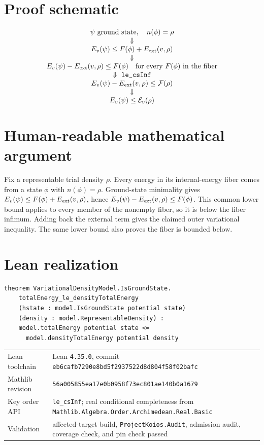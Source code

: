 \section{Proof schematic}
\[
\begin{array}{c}
 \psi\text{ ground state},\quad n(\phi)=\rho\\
 \Downarrow\\
 E_v(\psi)\le F(\phi)+E_{\rm ext}(v,\rho)\\
 \Downarrow\\
 E_v(\psi)-E_{\rm ext}(v,\rho)\le F(\phi)
 \quad\text{for every }F(\phi)\text{ in the fiber}\\
 \Downarrow\ \texttt{le\_csInf}\\
 E_v(\psi)-E_{\rm ext}(v,\rho)\le\mathcal F(\rho)\\
 \Downarrow\\
 E_v(\psi)\le\mathcal E_v(\rho)
\end{array}
\]

\section{Human-readable mathematical argument}
Fix a representable trial density \(\rho\).  Every energy in its internal-energy fiber comes from a
state \(\phi\) with \(n(\phi)=\rho\).  Ground-state minimality gives
\(E_v(\psi)\le F(\phi)+E_{\rm ext}(v,\rho)\), hence
\(E_v(\psi)-E_{\rm ext}(v,\rho)\le F(\phi)\).  This common lower bound applies to every member of
the nonempty fiber, so it is below the fiber infimum.  Adding back the external term gives the
claimed outer variational inequality.  The same lower bound also proves the fiber is bounded below.

\section{Lean realization}
\begin{lstlisting}
theorem VariationalDensityModel.IsGroundState.
    totalEnergy_le_densityTotalEnergy
    (hstate : model.IsGroundState potential state)
    (density : model.RepresentableDensity) :
    model.totalEnergy potential state <=
      model.densityTotalEnergy potential density
\end{lstlisting}
\begin{tabularx}{\textwidth}{@{}lY@{}}
\toprule
Lean toolchain & Lean \texttt{4.35.0}, commit \texttt{eb6cafb7290e8bd5f2937522d8d804f58f02bafc} \\
Mathlib revision & \texttt{56a005855ea17e0b0958f73ec801ae140b0a1679} \\
Key order API & \texttt{le\_csInf}; real conditional completeness from \texttt{Mathlib.Algebra.Order.Archimedean.Real.Basic} \\
Validation & affected-target build, \texttt{ProjectKoios.Audit}, admission audit, coverage check, and pin check passed \\
\bottomrule
\end{tabularx}


